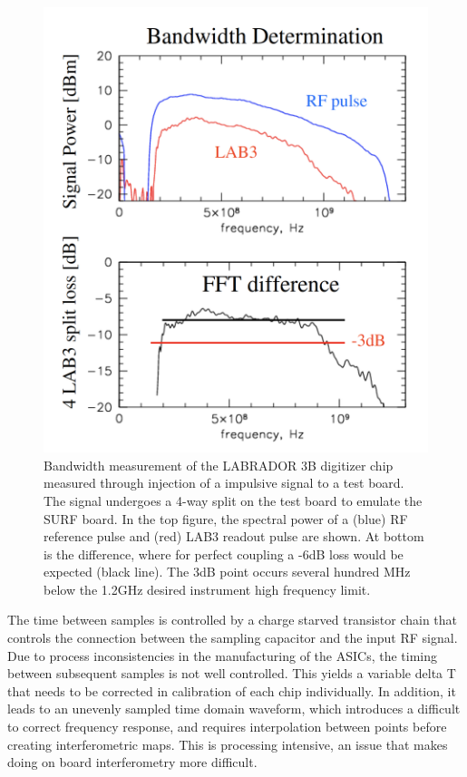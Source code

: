 \begin{figure}
\centering
	\includegraphics[width=\textwidth]{figures/LAB3B_bandwidth}
	\caption{Bandwidth measurement of the LABRADOR 3B digitizer chip measured through injection of a impulsive signal to a test board.  The signal undergoes a 4-way split on the test board to emulate the SURF board.  In the top figure, the spectral power of a (blue) RF reference pulse and (red) LAB3 readout pulse are shown. At bottom is the difference, where for perfect coupling a -6dB loss would be expected (black line). The 3dB point occurs several hundred MHz below the 1.2GHz desired instrument high frequency limit.\cite{LABASICPAPER}  }
	\label{fig:LAB3B_bandwidth}
\end{figure}
	
	The time between samples is controlled by a charge starved transistor chain that controls the connection between the sampling capacitor and the input RF signal.  Due to process inconsistencies in the manufacturing of the ASICs, the timing between subsequent samples is not well controlled.  This yields a variable delta T that needs to be corrected in calibration of each chip individually.  In addition, it leads to an unevenly sampled time domain waveform, which introduces a difficult to correct frequency response, and requires interpolation between points before creating interferometric maps.  This is processing intensive, an issue that makes doing on board interferometry more difficult.
	
